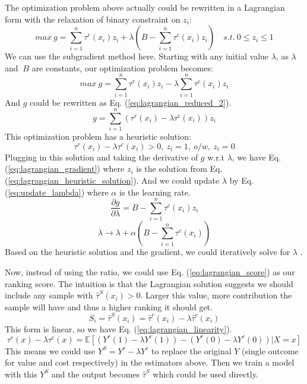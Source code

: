 The optimization problem above actually could be rewritten in a Lagrangian form with the relaxation of binary constraint on $z_i$:
\begin{equation}
  \label{eq:lagrangian}
  max \ g=\sum_{i=1}^n\tau^r(x_i)z_i + \lambda (B-\sum_{i=1}^n\tau^c(x_i)z_i) \quad s.t. \ 0\leq z_i \leq 1
\end{equation}
We can use the subgradient method here. Starting with any initial value $\lambda$, as $\lambda$ and $\ B$ are constants, our optimization problem becomes:
\begin{equation}
  \label{eq:lagrangian_reduced}
  max \ g=\sum_{i=1}^n\tau^r(x_i)z_i - \lambda\sum_{i=1}^n\tau^c(x_i)z_i
\end{equation}
And $g$ could be rewritten as Eq. (\ref{eq:lagrangian_reduced_2}). 
\begin{equation}
  \label{eq:lagrangian_reduced_2}
  g=\sum_{i=1}^n(\tau^r(x_i)-\lambda\tau^c(x_i))z_i
\end{equation}
This optimization problem has a heuristic solution:
\begin{equation}
  \label{eq:lagrangian_heuristic_solution}
  \tau^r(x_i)-\lambda\tau^c(x_i)>0, \ z_i=1, \ o/w, \ z_i=0
\end{equation}
Plugging in this solution and taking the derivative of $g$ w.r.t $\lambda$, we have Eq. (\ref{eq:lagrangian_gradient}) where $z_i$ is the solution from Eq. (\ref{eq:lagrangian_heuristic_solution}). And we could update $\lambda$ by Eq. (\ref{eq:update_lambda}) where $\alpha$ is the learning rate.
\begin{equation}
  \label{eq:lagrangian_gradient}
  \frac{\partial g}{\partial \lambda}=B-\sum_{i=1}^n\tau^c(x_i)z_i
\end{equation}
\begin{equation}
  \label{eq:update_lambda}
  \lambda\rightarrow \lambda + \alpha(B-\sum_{i=1}^n\tau^c(x_i))
\end{equation}
Based on the heuristic solution and the gradient, we could iteratively solve for $\lambda$ \cite{bertsekas1999nonlinear} .

Now, instead of using the ratio, we could use Eq. (\ref{eq:lagrangian_score}) as our ranking score. The intuition is that the Lagrangian solution suggests we should include any sample with $\hat\tau^S(x_i)>0$. Larger this value, more contribution the sample will have and thus a higher ranking it should get.
\begin{equation}
  \label{eq:lagrangian_score}
  S_i=\hat\tau^S(x_i)=\hat\tau^r(x_i)-\lambda\hat\tau^c(x_i)
\end{equation}
This form is linear, so we have Eq. (\ref{eq:lagrangian_linearity}).
\begin{equation}
  \label{eq:lagrangian_linearity}
  \tau^r(x) - \lambda \tau^c(x) = \mathbb{E}[(Y^r(1) - \lambda Y^c(1)) - (Y^r(0) - \lambda Y^c(0)) | X = x]
\end{equation}
This means we could use $Y^S=Y^r-\lambda Y^c$ to replace the original $Y$ (single outcome for value and cost respectively) in the estimators above. Then we train a model with this $Y^S$ and the output becomes $\hat\tau^S$ which could be used directly.

